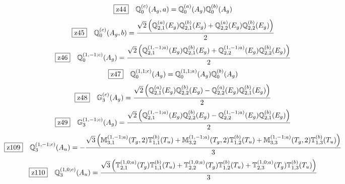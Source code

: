 \documentclass[fleqn,10pt,landscape]{jsarticle}
\begin{document}
\begin{dmath*}
\hspace*{3mm}\fbox{z44}\quad \mathbb{Q}_{0}^{(c)}(A_{g},a)=\mathbb{Q}_{0}^{(a)}(A_{g}) \mathbb{Q}_{0}^{(b)}(A_{g})
\end{dmath*}
\begin{dmath*}
\hspace*{3mm}\fbox{z45}\quad \mathbb{Q}_{0}^{(c)}(A_{g},b)=\frac{\sqrt{2} \left(\mathbb{Q}_{2,1}^{(a)}(E_{g}) \mathbb{Q}_{2,1}^{(b)}(E_{g}) + \mathbb{Q}_{2,2}^{(a)}(E_{g}) \mathbb{Q}_{2,2}^{(b)}(E_{g})\right)}{2}
\end{dmath*}
\begin{dmath*}
\hspace*{3mm}\fbox{z46}\quad \mathbb{Q}_{0}^{(1,-1;c)}(A_{g})=\frac{\sqrt{2} \left(\mathbb{Q}_{2,1}^{(1,-1;a)}(E_{g}) \mathbb{Q}_{2,1}^{(b)}(E_{g}) + \mathbb{Q}_{2,2}^{(1,-1;a)}(E_{g}) \mathbb{Q}_{2,2}^{(b)}(E_{g})\right)}{2}
\end{dmath*}
\begin{dmath*}
\hspace*{3mm}\fbox{z47}\quad \mathbb{Q}_{0}^{(1,1;c)}(A_{g})=\mathbb{Q}_{0}^{(1,1;a)}(A_{g}) \mathbb{Q}_{0}^{(b)}(A_{g})
\end{dmath*}
\begin{dmath*}
\hspace*{3mm}\fbox{z48}\quad \mathbb{G}_{3}^{(c)}(A_{g})=\frac{\sqrt{2} \left(\mathbb{Q}_{2,1}^{(a)}(E_{g}) \mathbb{Q}_{2,2}^{(b)}(E_{g}) - \mathbb{Q}_{2,2}^{(a)}(E_{g}) \mathbb{Q}_{2,1}^{(b)}(E_{g})\right)}{2}
\end{dmath*}
\begin{dmath*}
\hspace*{3mm}\fbox{z49}\quad \mathbb{G}_{3}^{(1,-1;c)}(A_{g})=\frac{\sqrt{2} \left(\mathbb{Q}_{2,1}^{(1,-1;a)}(E_{g}) \mathbb{Q}_{2,2}^{(b)}(E_{g}) - \mathbb{Q}_{2,2}^{(1,-1;a)}(E_{g}) \mathbb{Q}_{2,1}^{(b)}(E_{g})\right)}{2}
\end{dmath*}
\begin{dmath*}
\hspace*{3mm}\fbox{z109}\quad \mathbb{Q}_{3}^{(1,-1;c)}(A_{u})=- \frac{\sqrt{3} \left(\mathbb{M}_{3,1}^{(1,-1;a)}(T_{g},2) \mathbb{T}_{1,1}^{(b)}(T_{u}) + \mathbb{M}_{3,2}^{(1,-1;a)}(T_{g},2) \mathbb{T}_{1,2}^{(b)}(T_{u}) + \mathbb{M}_{3,3}^{(1,-1;a)}(T_{g},2) \mathbb{T}_{1,3}^{(b)}(T_{u})\right)}{3}
\end{dmath*}
\begin{dmath*}
\hspace*{3mm}\fbox{z110}\quad \mathbb{Q}_{3}^{(1,0;c)}(A_{u})=\frac{\sqrt{3} \left(\mathbb{T}_{2,1}^{(1,0;a)}(T_{g}) \mathbb{T}_{1,1}^{(b)}(T_{u}) + \mathbb{T}_{2,2}^{(1,0;a)}(T_{g}) \mathbb{T}_{1,2}^{(b)}(T_{u}) + \mathbb{T}_{2,3}^{(1,0;a)}(T_{g}) \mathbb{T}_{1,3}^{(b)}(T_{u})\right)}{3}
\end{dmath*}
\end{document}

